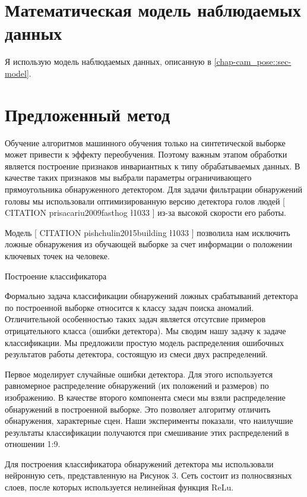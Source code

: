\section{Математическая модель наблюдаемых данных}

Я использую модель наблюдаемых данных, описанную в \ref{chap-cam_pose::sec-model}.

\section{Предложенный метод}

Обучение алгоритмов машинного обучения только на синтетической выборке может привести к эффекту переобучения. Поэтому важным этапом обработки является построение признаков инвариантных к типу обрабатываемых данных. В качестве таких признаков мы выбрали параметры ограничивающего прямоугольника обнаруженного детектором. Для задачи фильтрации обнаружений головы мы использовали оптимизированную версию детектора голов людей [ CITATION prisacariu2009fasthog \l 1033 ] из-за высокой скорости его работы.

Модель [ CITATION pishchulin2015building \l 1033 ] позволила нам исключить ложные обнаружения из обучающей выборке за счет информации о положении ключевых точек на человеке.

Построение классификатора

Формально задача классификации обнаружений ложных срабатываний детектора по построенной выборке относится к классу задач поиска аномалий. Отличительной особенностью таких задач является отсутсвие примеров отрицательного класса (ошибки детектора). Мы сводим нашу задачу к задаче классификации. Мы предложили простую модель распределения ошибочных результатов работы детектора, состоящую из смеси двух распределений.

Первое моделирует случайные ошибки детектора. Для этого используется равномерное распределение обнаружений (их положений и размеров) по изображению. В качестве второго компонента смеси мы взяли распределение обнаружений в построенной выборке. Это позволяет алгоритму отличить обнаружения, характерные сцен. Наши эксперименты показали, что наилучшие результаты классификации получаются при смешивание этих распределений в отношении 1:9.

Для построения классификатора обнаружений детектора мы использовали нейронную сеть, представленную на Рисунок 3. Сеть состоит из полносвязных слоев, после которых используется нелинейная функция ReLu.

